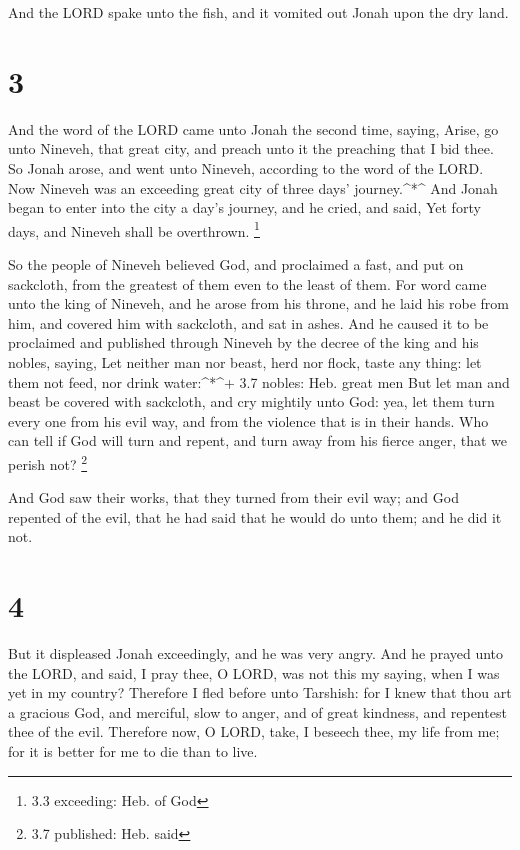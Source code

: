  And the LORD spake unto the fish, and it vomited out Jonah
upon the dry land.

\hypertarget{section-2}{%
\section{3}\label{section-2}}

 And the word of the LORD came unto Jonah the second time,
saying,  Arise, go unto Nineveh, that great city, and preach
unto it the preaching that I bid thee.  So Jonah arose, and
went unto Nineveh, according to the word of the LORD. Now Nineveh was an
exceeding great city of three days' journey.\^{}*\^{}  And
Jonah began to enter into the city a day's journey, and he cried, and
said, Yet forty days, and Nineveh shall be overthrown. \footnote{3.3
  exceeding: Heb. of God}

 So the people of Nineveh believed God, and proclaimed a
fast, and put on sackcloth, from the greatest of them even to the least
of them.  For word came unto the king of Nineveh, and he
arose from his throne, and he laid his robe from him, and covered him
with sackcloth, and sat in ashes.  And he caused it to be
proclaimed and published through Nineveh by the decree of the king and
his nobles, saying, Let neither man nor beast, herd nor flock, taste any
thing: let them not feed, nor drink water:\^{}*\^{}+ 3.7 nobles: Heb.
great men  But let man and beast be covered with sackcloth,
and cry mightily unto God: yea, let them turn every one from his evil
way, and from the violence that is in their hands.  Who can
tell if God will turn and repent, and turn away from his fierce anger,
that we perish not? \footnote{3.7 published: Heb. said}

 And God saw their works, that they turned from their evil
way; and God repented of the evil, that he had said that he would do
unto them; and he did it not.

\hypertarget{section-3}{%
\section{4}\label{section-3}}

 But it displeased Jonah exceedingly, and he was very angry.
 And he prayed unto the LORD, and said, I pray thee, O LORD,
was not this my saying, when I was yet in my country? Therefore I fled
before unto Tarshish: for I knew that thou art a gracious God, and
merciful, slow to anger, and of great kindness, and repentest thee of
the evil.  Therefore now, O LORD, take, I beseech thee, my
life from me; for it is better for me to die than to live.

